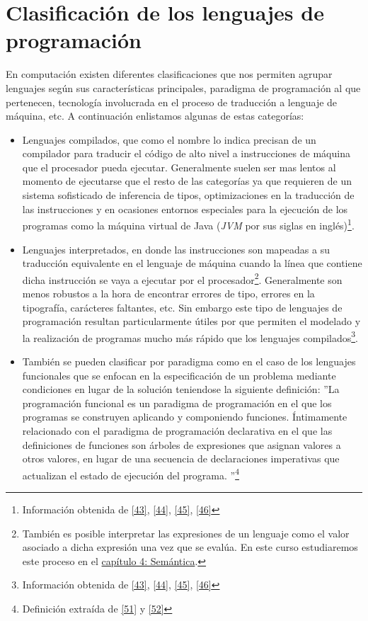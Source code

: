 \section{Clasificación de los lenguajes de programación}

    En computación existen diferentes clasificaciones que nos permiten agrupar lenguajes según sus características principales, paradigma de programación al que pertenecen, tecnología involucrada en el proceso de traducción a lenguaje de máquina, etc. A continuación enlistamos algunas de estas categorías: 

    \begin{itemize}
        \item Lenguajes compilados,  que como el nombre lo indica precisan de un compilador para traducir el código de alto nivel a instrucciones de máquina que el procesador pueda ejecutar. Generalmente suelen ser mas lentos al momento de ejecutarse que el resto de las categorías  ya que requieren de un sistema sofisticado de inferencia de tipos, optimizaciones en la traducción de las instrucciones y en ocasiones entornos especiales para la ejecución de los programas como la máquina virtual de Java (\textit{JVM} por sus siglas en inglés)\footnote{Información obtenida de \hyperlink{43}{[43]}, \hyperlink{44}{[44]}, \hyperlink{45}{[45]}, \hyperlink{46}{[46]}}.\\

        \item Lenguajes interpretados, en donde las instrucciones son mapeadas a su traducción equivalente en el lenguaje de máquina cuando la línea que contiene dicha instrucción se vaya a ejecutar por el procesador\footnote{También es posible interpretar las expresiones de un lenguaje como el valor asociado a dicha expresión una vez que se evalúa. En este curso estudiaremos este proceso en el \hyperref[sec:semantics]{capítulo 4: Semántica}.}. Generalmente son menos robustos a la hora de encontrar errores de tipo, errores en la tipografía, carácteres faltantes, etc. Sin embargo este tipo de lenguajes de programación resultan particularmente útiles por que permiten el modelado y la realización de programas mucho más rápido que los lenguajes compilados\footnote{Información obtenida de \hyperlink{43}{[43]}, \hyperlink{44}{[44]}, \hyperlink{45}{[45]}, \hyperlink{46}{[46]}}.\\

        \item También se pueden clasificar por paradigma como en el caso de los lenguajes funcionales que se enfocan en la especificación de un problema mediante condiciones en lugar de la solución teniendose la siguiente definición: 
         ''La programación funcional es un paradigma de programación en el que los programas se construyen aplicando y componiendo funciones. Íntimamente relacionado con el paradigma de programación declarativa en el que las definiciones de funciones son árboles de expresiones que asignan valores a otros valores, en lugar de una secuencia de declaraciones imperativas que actualizan el estado de ejecución del programa. ''\footnote{Definición extraída de \hyperlink{51}{[51]} y \hyperlink{52}{[52]}}\\


\end{itemize}
